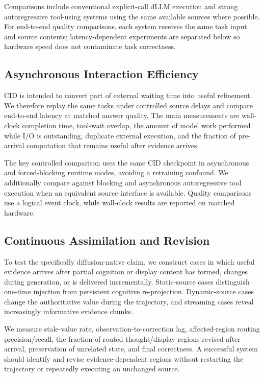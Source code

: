Comparisons include conventional explicit-call dLLM execution and strong autoregressive tool-using systems using the same available sources where possible. For end-to-end quality comparisons, each system receives the same task input and source contents; latency-dependent experiments are separated below so hardware speed does not contaminate task correctness.

\subsection{Asynchronous Interaction Efficiency}
\label{sec:async-efficiency}

CID is intended to convert part of external waiting time into useful refinement. We therefore replay the same tasks under controlled source delays and compare end-to-end latency at matched answer quality. The main measurements are wall-clock completion time, tool-wait overlap, the amount of model work performed while I/O is outstanding, duplicate external execution, and the fraction of pre-arrival computation that remains useful after evidence arrives.

The key controlled comparison uses the same CID checkpoint in asynchronous and forced-blocking runtime modes, avoiding a retraining confound. We additionally compare against blocking and asynchronous autoregressive tool execution when an equivalent source interface is available. Quality comparisons use a logical event clock, while wall-clock results are reported on matched hardware.

\subsection{Continuous Assimilation and Revision}
\label{sec:continuous-revision}

To test the specifically diffusion-native claim, we construct cases in which useful evidence arrives after partial cognition or display content has formed, changes during generation, or is delivered incrementally. Static-source cases distinguish one-time injection from persistent cognitive re-projection. Dynamic-source cases change the authoritative value during the trajectory, and streaming cases reveal increasingly informative evidence chunks.

We measure stale-value rate, observation-to-correction lag, affected-region routing precision/recall, the fraction of routed thought/display regions revised after arrival, preservation of unrelated state, and final correctness. A successful system should identify and revise evidence-dependent regions without restarting the trajectory or repeatedly executing an unchanged source.


